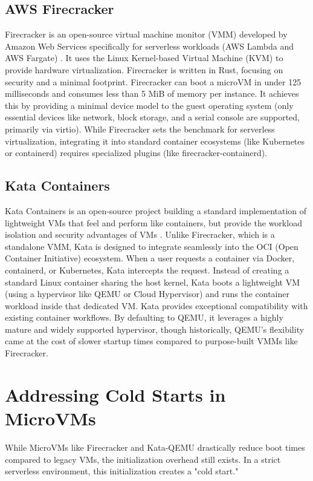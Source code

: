 \subsection{AWS Firecracker}
Firecracker is an open-source virtual machine monitor (VMM) developed by Amazon Web Services specifically for serverless workloads (AWS Lambda and AWS Fargate) \cite{agache2020firecracker}. It uses the Linux Kernel-based Virtual Machine (KVM) to provide hardware virtualization. Firecracker is written in Rust, focusing on security and a minimal footprint.
Firecracker can boot a microVM in under 125 milliseconds and consumes less than 5 MiB of memory per instance. It achieves this by providing a minimal device model to the guest operating system (only essential devices like network, block storage, and a serial console are supported, primarily via virtio). While Firecracker sets the benchmark for serverless virtualization, integrating it into standard container ecosystems (like Kubernetes or containerd) requires specialized plugins (like firecracker-containerd).

\subsection{Kata Containers}
Kata Containers is an open-source project building a standard implementation of lightweight VMs that feel and perform like containers, but provide the workload isolation and security advantages of VMs \cite{kata2023}.
Unlike Firecracker, which is a standalone VMM, Kata is designed to integrate seamlessly into the OCI (Open Container Initiative) ecosystem. When a user requests a container via Docker, containerd, or Kubernetes, Kata intercepts the request. Instead of creating a standard Linux container sharing the host kernel, Kata boots a lightweight VM (using a hypervisor like QEMU or Cloud Hypervisor) and runs the container workload inside that dedicated VM.
Kata provides exceptional compatibility with existing container workflows. By defaulting to QEMU, it leverages a highly mature and widely supported hypervisor, though historically, QEMU's flexibility came at the cost of slower startup times compared to purpose-built VMMs like Firecracker.

\section{Addressing Cold Starts in MicroVMs}
While MicroVMs like Firecracker and Kata-QEMU drastically reduce boot times compared to legacy VMs, the initialization overhead still exists. In a strict serverless environment, this initialization creates a "cold start."

